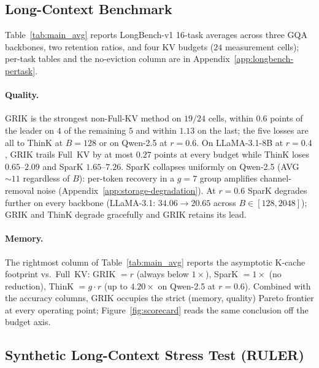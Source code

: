 \documentclass{article}
\begin{document}
\subsection{Long-Context Benchmark}
\label{sec:longbench}






Table~\ref{tab:main_avg} reports LongBench-v1 16-task averages across three GQA backbones, two retention ratios, and four KV budgets ($24$ measurement cells); per-task tables and the no-eviction column are in Appendix~\ref{app:longbench-pertask}.
 
\paragraph{Quality.} GRIK is the strongest non-Full-KV method on $19/24$ cells, within $0.6$ points of the leader on $4$ of the remaining $5$ and within $1.13$ on the last; the five losses are all to ThinK at $B{=}128$ or on Qwen-2.5 at $r{=}0.6$. On LLaMA-3.1-8B at $r{=}0.4$, GRIK trails Full~KV by at most $0.27$ points at every budget while ThinK loses $0.65\text{--}2.09$ and SparK $1.65\text{--}7.26$. SparK collapses uniformly on Qwen-2.5 (AVG $\sim 11$ regardless of $B$): per-token recovery in a $g{=}7$ group amplifies channel-removal noise (Appendix~\ref{app:storage-degradation}). At $r{=}0.6$ SparK degrades further on every backbone (LLaMA-3.1: $34.06 \to 20.65$ across $B \in [128, 2048]$); GRIK and ThinK degrade gracefully and GRIK retains its lead.
 

 
\paragraph{Memory.} The rightmost column of Table~\ref{tab:main_avg} reports the asymptotic K-cache footprint vs.\ Full~KV: GRIK $= r$ (always below $1\times$), SparK $= 1\times$ (no reduction), ThinK $= g \cdot r$ (up to $4.20\times$ on Qwen-2.5 at $r{=}0.6$). Combined with the accuracy columns, GRIK occupies the strict (memory, quality) Pareto frontier at every operating point; Figure~\ref{fig:scorecard} reads the same conclusion off the budget axis.
 

\subsection{Synthetic Long-Context Stress Test (RULER)}
\label{sec:ruler}
 
\end{document}
